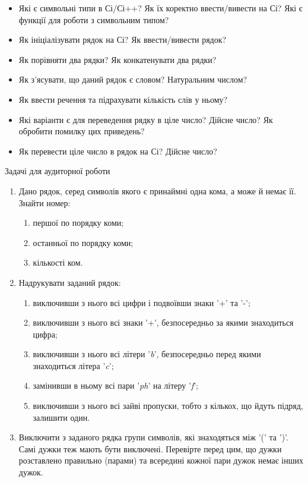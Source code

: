 \documentclass[]{article}
\makeatletter
\newcommand{\xslalph}[1]{\expandafter\@xslalph\csname c@#1\endcsname}
\newcommand{\@xslalph}[1]{%
    \ifcase#1\or а\or б\or в\or г\or д\or e\or є\or ж\or з\or i%
    \or й\or к\or л\or м\or н\or о\or п\or р\or с\or т%
    \or у\or ф\or х\or ц\or ч\or ш\or ю\or я\or аа\or бб\or вв%
    \else\@ctrerr\fi%
}
\makeatother
\begin{document}
\begin{enumerate}
\begin{enumerate}[label=\xslalph*)]
\begin{enumerate}
\begin{enumerate}[label=\xslalph*)]
\begin{itemize}
\item
Які є символьні типи в Сі/Сі++? Як їх коректно ввести/вивести на Сі? Які
є функції для роботи з символьним типом?
\item
Як ініціалізувати рядок на Сі? Як ввести/вивести рядок?
\item
Як порівняти два рядки? Як конкатенувати два рядки?
\item
Як з'ясувати, що даний рядок є словом? Натуральним числом?
\item
Як ввести речення та підрахувати кількість слів у ньому?
\item
Які варіанти є для переведення рядку в ціле число? Дійсне число? Як
обробити помилку цих приведень?
\item
Як перевести ціле число в рядок на Сі? Дійсне число?
\end{itemize}

Задачі для аудиторної роботи
\begin{enumerate}
\def\labelenumi{\arabic{enumi})}
\item
Дано рядок, серед символів якого є принаймні одна кома, а може й
немає її. Знайти номер:
\begin{enumerate}[label=\xslalph*)]
\item першої по порядку коми;
\item останньої по порядку коми;
\item кількості ком.
\end{enumerate}

\item
Надрукувати заданий рядок:
 \begin{enumerate}[label=\xslalph*)]
 \item виключивши з нього всі цифри і подвоївши знаки '+' та '-';
 \item виключивши з нього всі знаки '+', безпосередньо за якими знаходиться
цифра;
 \item виключивши з нього всі літери '\emph{b}', безпосередньо перед якими
знаходиться літера '\emph{c}';
 \item замінивши в ньому всі пари '\emph{ph}' на літеру '\emph{f}';
 \item виключивши з нього всі зайві пропуски, тобто з кількох, що йдуть
підряд, залишити один.
\end{enumerate}

\item
Виключити з заданого рядка групи символів, які знаходяться між '(' та
')'. Самі дужки теж мають бути виключені. Перевірте перед цим, що дужки
розставлено правильно (парами) та всередині кожної пари дужок немає
інших дужок.


\end{enumerate}
\end{enumerate}
\end{enumerate}
\end{enumerate}
\end{enumerate}
\end{document}
